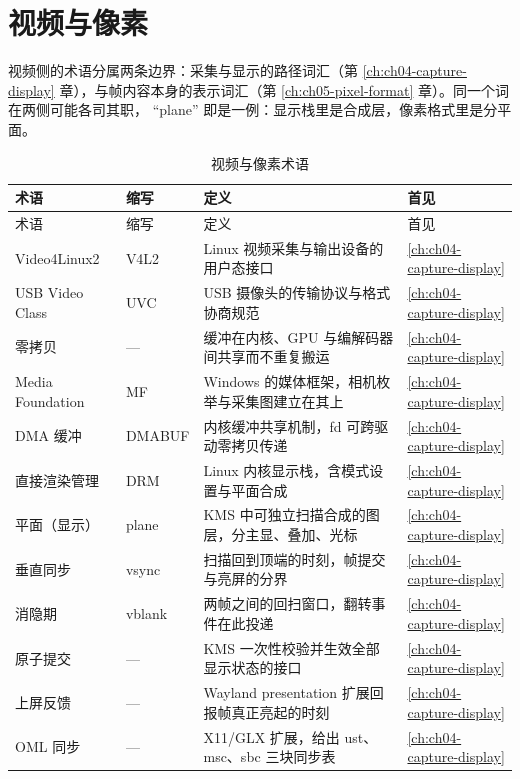 \documentclass[12pt,a4paper,fontset=fandol]{ctexbook}
\begin{document}
\section{视频与像素}

视频侧的术语分属两条边界：采集与显示的路径词汇（第
\ref{ch:ch04-capture-display} 章），与帧内容本身的表示词汇（第
\ref{ch:ch05-pixel-format} 章）。同一个词在两侧可能各司其职，
``plane'' 即是一例：显示栈里是合成层，像素格式里是分平面。

\begin{longtable}{>{\raggedright\arraybackslash}p{} >{\raggedright\arraybackslash}p{} >{\raggedright\arraybackslash}p{} >{\raggedright\arraybackslash}p{}}
\caption{视频与像素术语}\label{tab:apa-video} \\
\toprule
术语 & 缩写 & 定义 & 首见 \\
\midrule
\endfirsthead
\toprule
术语 & 缩写 & 定义 & 首见 \\
\midrule
\endhead
\bottomrule
\endfoot
Video4Linux2 & V4L2 & Linux 视频采集与输出设备的用户态接口 & \ref{ch:ch04-capture-display} \\
USB Video Class & UVC & USB 摄像头的传输协议与格式协商规范 & \ref{ch:ch04-capture-display} \\
零拷贝 & — & 缓冲在内核、GPU 与编解码器间共享而不重复搬运 & \ref{ch:ch04-capture-display} \\
Media Foundation & MF & Windows 的媒体框架，相机枚举与采集图建立在其上 & \ref{ch:ch04-capture-display} \\
DMA 缓冲 & DMABUF & 内核缓冲共享机制，fd 可跨驱动零拷贝传递 & \ref{ch:ch04-capture-display} \\
直接渲染管理 & DRM & Linux 内核显示栈，含模式设置与平面合成 & \ref{ch:ch04-capture-display} \\
平面（显示） & plane & KMS 中可独立扫描合成的图层，分主显、叠加、光标 & \ref{ch:ch04-capture-display} \\
垂直同步 & vsync & 扫描回到顶端的时刻，帧提交与亮屏的分界 & \ref{ch:ch04-capture-display} \\
消隐期 & vblank & 两帧之间的回扫窗口，翻转事件在此投递 & \ref{ch:ch04-capture-display} \\
原子提交 & — & KMS 一次性校验并生效全部显示状态的接口 & \ref{ch:ch04-capture-display} \\
上屏反馈 & — & Wayland presentation 扩展回报帧真正亮起的时刻 & \ref{ch:ch04-capture-display} \\
OML 同步 & — & X11/GLX 扩展，给出 ust、msc、sbc 三块同步表 & \ref{ch:ch04-capture-display} \\

\end{longtable}
\end{document}
